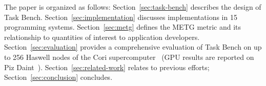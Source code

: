 

The paper is organized as follows: Section~\ref{sec:task-bench}
describes the design of Task Bench. Section~\ref{sec:implementation}
discusses implementations in 15 programming systems.
Section~\ref{sec:metg} defines the METG metric and its
relationship to quantities of interest to application developers.
Section~\ref{sec:evaluation} provides a comprehensive evaluation of
Task Bench on up to 256 Haswell nodes of the Cori
supercomputer~\cite{Cori} (GPU results are reported on Piz Daint~\cite{PizDaint}). Section~\ref{sec:related-work} relates to previous efforts; Section~\ref{sec:conclusion} concludes.
